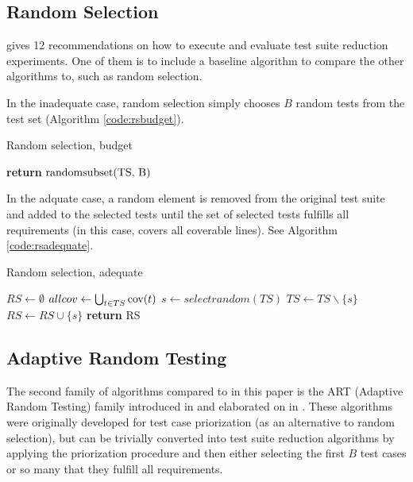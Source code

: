 \subsection{Random Selection}

\cite{khan2018systematic} gives 12 recommendations on how to execute and
evaluate test suite reduction experiments. One of them is to include a
baseline algorithm to compare the other algorithms to, such as random
selection.

In the inadequate case, random selection simply chooses $B$ random tests
from the test set (Algorithm \autoref{code:rsbudget}).

\begin{algorithm}
\caption[Random selection, budget]{Random selection, budget}\label{code:rsbudget}
\begin{algorithmic}
	\State \textbf{return} $\hbox{randomsubset(TS, B)}$
\EndFunction
\end{algorithmic}
\end{algorithm}

In the adquate case, a random element is removed from the original test
suite and added to the selected tests until the set of selected tests
fulfills all requirements (in this case, covers all coverable lines). See
Algorithm \autoref{code:rsadequate}.

\begin{algorithm}
\caption[Random selection, adequate]{Random selection, adequate}\label{code:rsadequate}
\begin{algorithmic}
	\State $RS \gets \emptyset$
	\State $allcov \gets \bigcup_{t \in TS} \hbox{cov}(t)$
		\State $s \gets selectrandom(TS)$
		\State $TS \gets TS \backslash \{s\}$
		\State $RS \gets RS \cup \{s\}$
	\EndWhile
	\State \textbf{return} RS
\EndFunction
\end{algorithmic}
\end{algorithm}

\subsection{Adaptive Random Testing}

The second family of algorithms compared to in this paper is the ART
(Adaptive Random Testing) family introduced in \cite{jiang2009adaptive}
and elaborated on in \cite{chen2010adaptive}. These algorithms were
originally developed for test case priorization (as an alternative
to random selection), but can be trivially converted into test suite
reduction algorithms by applying the priorization procedure and then
either selecting the first $B$ test cases or so many that they fulfill
all requirements.

